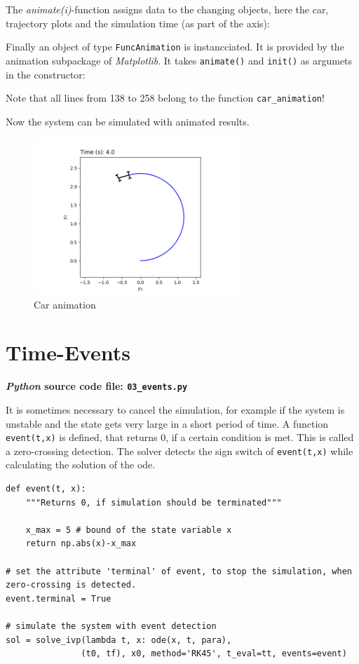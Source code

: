 \documentclass[a4paper,11pt,headinclude=true,headsepline,parskip=half,DIV=13]{scrartcl}
\newcommand{\listcode}[3]{}
\newcommand{\listcodeanim}[2]{\listcode{#1}{#2}{../sim/02_car_example_animation.py}}
\newcommand{\py}{\emph{Python}\xspace}
\newcommand{\mpl}{\emph{Matplotlib}\xspace}
\begin{document}
The \emph{animate(i)}-function assigns data to the changing objects, here the car, trajectory plots and the simulation time (as part of the axis):
\listcodeanim{236}{250}

Finally an object of type \texttt{FuncAnimation} is instancciated. It is provided by the animation subpackage of \mpl. It takes  \texttt{animate()} and \texttt{init()} as argumets in the constructor:
\listcodeanim{252}{258}

Note that all lines from 138 to 258 belong to the function \texttt{car\_animation}!

Now the system can be simulated with animated results.
\listcodeanim{275}{277}

\begin{figure}[ht]
  \centering
  \includegraphics[width=0.7\textwidth]{img/animation}
  \caption{Car animation}
  \label{fig:animation}
\end{figure}
        

\section{Time-Events}
\textbf{\py source code file: \texttt{03\_events.py}}

It is sometimes necessary to cancel the simulation, for example if the system is unstable and the state gets very large in a short period of time. A function \texttt{event(t,x)} is defined, that returns 0, if a certain condition is met. This is called a zero-crossing detection. The solver detects the sign switch of \texttt{event(t,x)} while calculating the solution of the \gls{ode}.
\begin{lstlisting}
def event(t, x):
	"""Returns 0, if simulation should be terminated"""
	
	x_max = 5 # bound of the state variable x
	return np.abs(x)-x_max
		
# set the attribute 'terminal' of event, to stop the simulation, when zero-crossing is detected.
event.terminal = True

# simulate the system with event detection
sol = solve_ivp(lambda t, x: ode(x, t, para), 
               (t0, tf), x0, method='RK45', t_eval=tt, events=event)
\end{lstlisting}
\printglossaries
\end{document}
